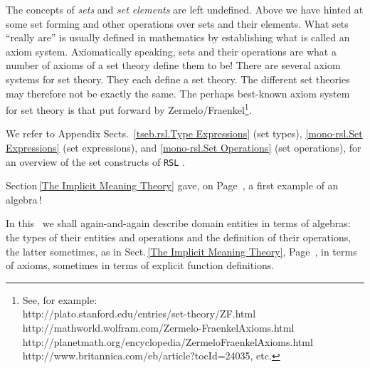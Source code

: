 \mnewfoil

\noindent
\begynd
\pind The concepts of \textsl{sets} and \textsl{set elements} are
  left undefined.
\pind Above we have hinted at some set forming and other operations
over sets and their elements.
\pind What sets ``really are'' is usually defined in mathematics by
establishing what is called an axiom system.
\pind Axiomatically speaking,
  sets and their operations are what a number of axioms of a set theory
  define them to be! 
\newfoil
\pind There are several axiom systems for set theory.
\pind They each define a set theory. 
\pind The different set theories may
      therefore not be exactly the same.
\pind The perhaps best-known axiom system for set theory is that put
    forward by Zermelo/Fraenkel\footnote{See,
    for example:\\  
http://plato.stanford.edu/entries/set-theory/ZF.html\\
http://mathworld.wolfram.com/Zermelo-FraenkelAxioms.html\\
http://planetmath.org/encyclopedia/ZermeloFraenkelAxioms.html\\
http://www.britannica.com/eb/article?tocId=24035, etc.}.  
\afslut

\mnewfoil

\begynd
\pind We refer to Appendix Sects.\,%
  \vref{tseb.rsl.Type Expressions} (set types),
  \vref{mono-rsl.Set Expressions} (set expressions), and
  \vref{mono-rsl.Set Operations} (set operations),
  for an overview of the set
      constructs of \texttt{RSL} \cite{RSL}.
\afslut


\tbw

\label{Algebra}



\noindent
\begynd
\pind Section\,\ref{The Implicit Meaning Theory}
      gave, on Page \,\pageref{algebra.1}, a first example
      of an algebra\,!
\afslut

\begynd
\pind In this \primer\ we shall again-and-again describe domain
      entities in terms of algebras: the types of their entities and
      operations and the definition of their operations, the latter sometimes, as in
      Sect.\,\ref{The Implicit Meaning Theory},  Page
      \,\pageref{algebra.1}, in terms of axioms, sometimes in terms of
      explicit function definitions. 
\afslut

